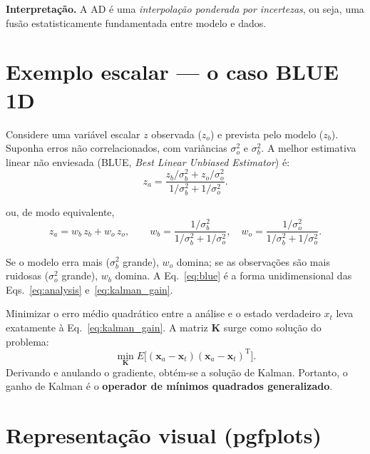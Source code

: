 \noindent
\textbf{Interpretação.}  
A AD é uma \textit{interpolação ponderada por incertezas}, ou seja, uma fusão estatisticamente fundamentada entre modelo e dados.

\section{Exemplo escalar --- o caso BLUE 1D}

Considere uma variável escalar \(z\) observada (\(z_o\)) e prevista pelo modelo (\(z_b\)).  
Suponha erros não correlacionados, com variâncias \(\sigma_o^2\) e \(\sigma_b^2\).  
A melhor estimativa linear não enviesada (BLUE, \textit{Best Linear Unbiased Estimator}) é:
\begin{equation}
z_a = 
\dfrac{z_b/\sigma_b^2 + z_o/\sigma_o^2}
      {1/\sigma_b^2 + 1/\sigma_o^2}.
\label{eq:blue}
\end{equation}

ou, de modo equivalente,
\begin{equation}
z_a =
w_b\,z_b + w_o\,z_o,
\qquad
w_b = \dfrac{1/\sigma_b^2}{1/\sigma_b^2 + 1/\sigma_o^2},
\quad
w_o = \dfrac{1/\sigma_o^2}{1/\sigma_b^2 + 1/\sigma_o^2}.
\end{equation}

Se o modelo erra mais (\(\sigma_b^2\) grande), \(w_o\) domina; se as observações são mais ruidosas (\(\sigma_o^2\) grande), \(w_b\) domina.  
A Eq.~\eqref{eq:blue} é a forma unidimensional das Eqs.~\eqref{eq:analysis} e~\eqref{eq:kalman_gain}.

\begin{tcolorbox}[title={Ligação com mínimos quadrados},colback=gray!5!white]
Minimizar o erro médio quadrático entre a análise e o estado verdadeiro \(x_t\) leva exatamente à Eq.~\eqref{eq:kalman_gain}.  
A matriz \(\mathbf{K}\) surge como solução do problema:
\[
\min_{\mathbf{K}} 
E\big[(\mathbf{x}_a - \mathbf{x}_t)(\mathbf{x}_a - \mathbf{x}_t)^\mathrm{T}\big].
\]
Derivando e anulando o gradiente, obtém-se a solução de Kalman.  
Portanto, o ganho de Kalman é o \textbf{operador de mínimos quadrados generalizado}.
\end{tcolorbox}

\section{Representação visual (pgfplots)}

